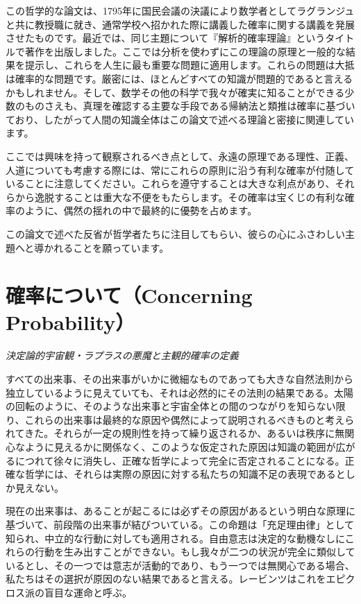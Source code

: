 \documentclass[a4paper,11pt,openany]{ltjsbook}
\begin{document}
この哲学的な論文は、1795年に国民会議の決議により数学者としてラグランジュと共に教授職に就き、通常学校へ招かれた際に講義した確率に関する講義を発展させたものです。最近では、同じ主題について『解析的確率理論』というタイトルで著作を出版しました。ここでは分析を使わずにこの理論の原理と一般的な結果を提示し、これらを人生に最も重要な問題に適用します。これらの問題は大抵は確率的な問題です。厳密には、ほとんどすべての知識が問題的であると言えるかもしれません。そして、数学その他の科学で我々が確実に知ることができる少数のものさえも、真理を確認する主要な手段である帰納法と類推は確率に基づいており、したがって人間の知識全体はこの論文で述べる理論と密接に関連しています。

ここでは興味を持って観察されるべき点として、永遠の原理である理性、正義、人道についても考慮する際には、常にこれらの原則に沿う有利な確率が付随していることに注意してください。これらを遵守することは大きな利点があり、それらから逸脱することは重大な不便をもたらします。その確率は宝くじの有利な確率のように、偶然の揺れの中で最終的に優勢を占めます。

この論文で述べた反省が哲学者たちに注目してもらい、彼らの心にふさわしい主題へと導かれることを願っています。

\newpage

\chapter{確率について（Concerning Probability）}
\label{ch:ii}

\begin{center}
\large\textit{決定論的宇宙観・ラプラスの悪魔と主観的確率の定義}
\end{center}
\vspace{4mm}

すべての出来事、その出来事がいかに微細なものであっても大きな自然法則から独立しているように見えていても、それは必然的にその法則の結果である。太陽の回転のように、そのような出来事と宇宙全体との間のつながりを知らない限り、これらの出来事は最終的な原因や偶然によって説明されるべきものと考えられてきた。それらが一定の規則性を持って繰り返されるか、あるいは秩序に無関心なように見えるかに関係なく、このような仮定された原因は知識の範囲が広がるにつれて徐々に消失し、正確な哲学によって完全に否定されることになる。正確な哲学には、それらは実際の原因に対する私たちの知識不足の表現であるとしか見えない。

現在の出来事は、あることが起こるには必ずその原因があるという明白な原理に基づいて、前段階の出来事が結びついている。この命題は「充足理由律」として知られ、中立的な行動に対しても適用される。自由意志は決定的な動機なしにこれらの行動を生み出すことができない。もし我々が二つの状況が完全に類似しているとし、その一つでは意志が活動的であり、もう一つでは無関心である場合、私たちはその選択が原因のない結果であると言える。レービンツはこれをエピクロス派の盲目な運命と呼ぶ。
\end{document}
